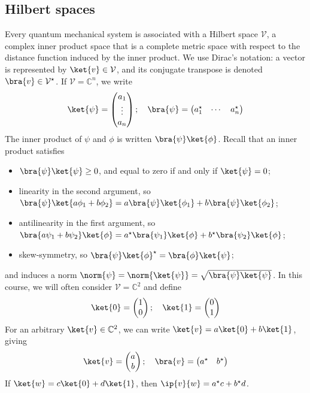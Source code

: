 \subsection{Hilbert spaces}
Every quantum mechanical system is associated with a Hilbert space $\mathcal V$, a complex inner product space that is a complete metric space with respect to the distance function induced by the inner product.
We use Dirac's  notation: a vector is represented by $\ket{v} \in \mathcal V$, and its conjugate transpose is denoted $\bra{v} \in \mathcal V^\star$.
If $\mathcal V = \mathbb C^n$, we write
\[ \ket{\psi} = \begin{pmatrix}
    a_1 \\
    \vdots \\
    a_n
\end{pmatrix};\quad \bra{\psi} = \begin{pmatrix}
    a_1^\star & \cdots & a_n^\star
\end{pmatrix} \]
The inner product of $\psi$ and $\phi$ is written $\bra{\psi}\ket{\phi}$.
Recall that an inner product satisfies
\begin{itemize}
    \item $\bra{\psi}\ket{\psi} \geq 0$, and equal to zero if and only if $\ket{\psi} = 0$;
    \item linearity in the second argument, so $\bra{\psi}\ket{a\phi_1 + b\phi_2} = a \bra{\psi}\ket{\phi_1} + b \bra{\psi}\ket{\phi_2}$;
    \item antilinearity in the first argument, so $\bra{a\psi_1 + b\psi_2}\ket{\phi} = a^\star \bra{\psi_1}\ket{\phi} + b^\star \bra{\psi_2}\ket{\phi}$;
    \item skew-symmetry, so $\bra{\psi}\ket{\phi}^\star = \bra{\phi}\ket{\psi}$;
\end{itemize}
and induces a norm $\norm{\psi} = \norm{\ket{\psi}} = \sqrt{\bra{\psi}\ket{\psi}}$.
In this course, we will often consider $\mathcal V = \mathbb C^2$ and define
\[ \ket{0} = \begin{pmatrix}
    1 \\ 0
\end{pmatrix};\quad \ket{1} = \begin{pmatrix}
    0 \\ 1
\end{pmatrix} \]
For an arbitrary $\ket{v} \in \mathbb C^2$, we can write $\ket{v} = a \ket{0} + b \ket{1}$, giving
\[ \ket{v} = \begin{pmatrix}
    a \\ b
\end{pmatrix};\quad \bra{v} = \begin{pmatrix}
    a^\star & b^\star
\end{pmatrix} \]
If $\ket{w} = c \ket{0} + d \ket{1}$, then $\ip{v}{w} = a^\star c + b^\star d$.

